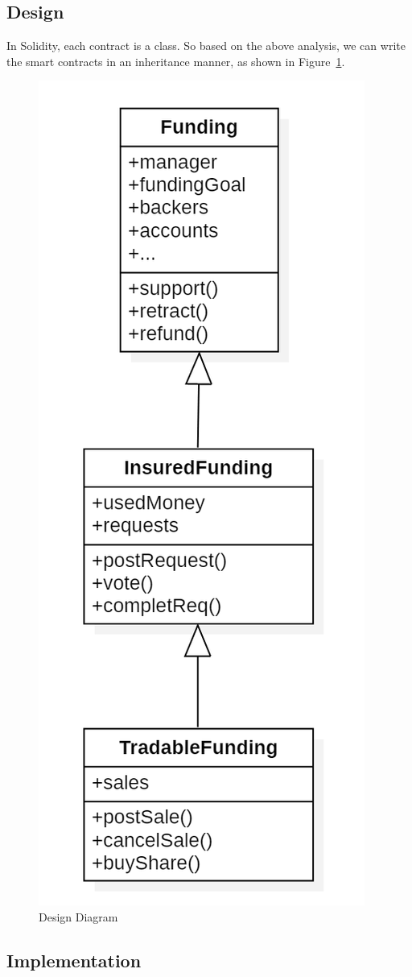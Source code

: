 \documentclass{article}
\begin{document}
\subsection{Design}
In Solidity, each contract is a class. So based on the above analysis, we can write the smart contracts in an inheritance manner, as shown in Figure~\ref{fig:design}.

\begin{figure}[H]
    \centering
    \includegraphics[width=0.3\linewidth]{fig/design.png}
    \caption{Design Diagram}
    \label{fig:design}
\end{figure}

\subsection{Implementation}
\end{document}
